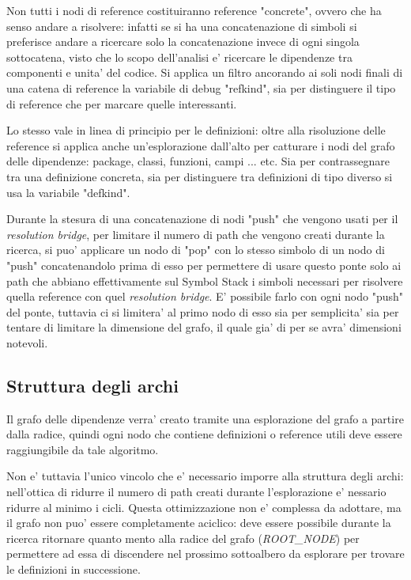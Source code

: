 \par
Non tutti i nodi di reference costituiranno reference "concrete", ovvero che ha senso andare a risolvere: infatti se si ha una concatenazione di simboli si preferisce andare a ricercare solo la concatenazione invece di ogni singola sottocatena, visto che lo scopo dell'analisi e' ricercare le dipendenze tra componenti e unita' del codice. Si applica un filtro ancorando ai soli nodi finali di una catena di reference la variabile di debug "refkind", sia per distinguere il tipo di reference che per marcare quelle interessanti.

\par
Lo stesso vale in linea di principio per le definizioni: oltre alla risoluzione delle reference si applica anche un'esplorazione dall'alto per catturare i nodi del grafo delle dipendenze: package, classi, funzioni, campi ... etc. Sia per contrassegnare tra una definizione concreta, sia per distinguere tra definizioni di tipo diverso si usa la variabile "defkind".

\par
Durante la stesura di una concatenazione di nodi "push" che vengono usati per il \emph{resolution bridge}, per limitare il numero di path che vengono creati durante la ricerca, si puo' applicare un nodo di "pop" con lo stesso simbolo di un nodo di "push" concatenandolo prima di esso per permettere di usare questo ponte solo ai path che abbiano effettivamente sul Symbol Stack i simboli necessari per risolvere quella reference con quel \emph{resolution bridge}.
E' possibile farlo con ogni nodo "push" del ponte, tuttavia ci si limitera' al primo nodo di esso sia per semplicita' sia per tentare di limitare la dimensione del grafo, il quale gia' di per se avra' dimensioni notevoli.

\subsection{Struttura degli archi}

Il grafo delle dipendenze verra' creato tramite una esplorazione del grafo a partire dalla radice, quindi ogni nodo che contiene definizioni o reference utili deve essere raggiungibile da tale algoritmo.

\par
Non e' tuttavia l'unico vincolo che e' necessario imporre alla struttura degli archi: nell'ottica di ridurre il numero di path creati durante l'esplorazione e' nessario ridurre al minimo i cicli.
Questa ottimizzazione non e' complessa da adottare, ma il grafo non puo' essere completamente aciclico: deve essere possibile durante la ricerca ritornare quanto mento alla radice del grafo (\emph{ROOT\_NODE}) per permettere ad essa di discendere nel prossimo sottoalbero da esplorare per trovare le definizioni in successione.

